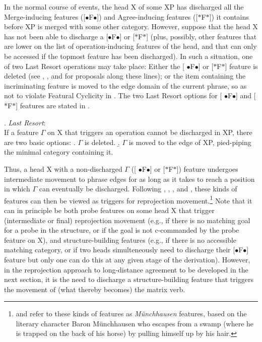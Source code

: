 \documentclass[output=paper
,modfonts
,nonflat]{langsci/langscibook}
\begin{document}
In the normal course of events, the head X of some XP has discharged
all the Merge-inducing features ([{\small $\bullet$}F{\small $\bullet$}])
 and Agree-inducing features ([$*$F$*$]) it contains before XP is merged with some
 other category. However, suppose that the head X has not been able to
 discharge a [{\small $\bullet$}F{\small $\bullet$}] or [$*$F$*$]
 (plus, possibly, other features that are lower on the list of
 operation-inducing features of the head, and that can only be accessed
 if the topmost feature has been discharged). In such a situation, one
 of two Last Resort operations may take place: Either the [{\small
     $\bullet$}F{\small $\bullet$}] or [$*$F$*$] feature is deleted (see 
\cite{Bejar&Rezac:09},
  \cite{Preminger:14}, and  \cite{Georgi:14} for proposals along these
  lines); or the item containing the incriminating feature is moved to the edge domain of
  the current phrase, so as not to violate Featural Cyclicity
  in \Last. The two Last Resort options for [{\small
      $\bullet$}F{\small $\bullet$}] and [$*$F$*$] features are stated
  in \Next. 

\Lsciex. {\it Last Resort}:\\
If a feature $\Gamma$ on X that triggers an operation cannot be discharged
in XP, there are two basic options:
\a. $\Gamma$ is deleted.
\b. $\Gamma$ is moved to the edge of XP, pied-piping the minimal
category containing it. 

Thus, a head X with a non-discharged $\Gamma$ ([{\small
    $\bullet$}F{\small $\bullet$}] or [$*$F$*$]) feature undergoes
intermediate movement to phrase edges for as long as it takes to reach
a position in which $\Gamma$ can eventually be discharged.  Following
\cite{Fanselow:03,Fanselow:09:boo}, \cite{Suranyi:05},
\cite{Matushansky:06}, and \cite{Georgi&Mueller:10:rep}, these kinds
of features can then be viewed as triggers for reprojection
movement.\footnote{\cite{Fanselow:03,Fanselow:09:boo} and
  \cite{Georgi&Mueller:10:rep} refer to these kinds of features as
       {\it M\"unchhausen} features, based on the literary character
       Baron M\"unchhausen who escapes from a swamp (where he is
       trapped on the back of his horse) by pulling himself up by his
       hair.} Note that it can in principle be both probe features on
some head X that trigger (intermediate or final) reprojection movement
(e.g., if there is no matching goal for a probe in the structure, or
if the goal is not c-commanded by the probe feature on X), and
structure-building features (e.g., if there is no accessible matching
category, or if two heads simulteneously need to discharge their
[{\small $\bullet$}F{\small $\bullet$}] feature but only one can do
this at any given stage of the derivation). However, in the
reprojection approach to long-distance agreement to be developed in
the next section, it is the need to discharge a structure-building
feature that triggers the movement of (what thereby becomes) the
matrix verb.
\end{document}
